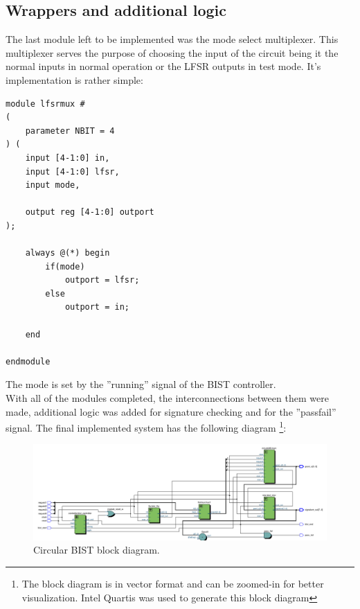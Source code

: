\documentclass[12pt]{article}
\begin{document}
    \subsection*{Wrappers and additional logic}
    
    The last module left to be implemented was the mode select multiplexer. This multiplexer serves the purpose of choosing the input of the circuit being it the normal inputs in normal operation or the LFSR outputs in test mode. It's implementation is rather simple:
    
    \begin{lstlisting}[caption={Multiplexer code.},captionpos=b]
module lfsrmux #
(
    parameter NBIT = 4     
) (
    input [4-1:0] in,
    input [4-1:0] lfsr,
    input mode,

    output reg [4-1:0] outport
);
    
    always @(*) begin
        if(mode)
            outport = lfsr;
        else
            outport = in;
        
    end

endmodule
    \end{lstlisting}     
    The mode is set by the ''running'' signal of the BIST controller.\\
    
    
    With all of the modules completed, the interconnections between them were made, additional logic was added for signature checking and for the ''pass\textunderscore fail'' signal. The final implemented system has the following diagram \footnote{The block diagram is in vector format and can be zoomed-in for better visualization. Intel Quartis was used to generate this block diagram}:
    
    \begin{figure}[!htb]
        \centering
        \includegraphics[scale=0.8]{block_diagram.pdf}
            \caption{Circular BIST block diagram.}
            \label{fig:bd}
    \end{figure}
    
\newpage
    
\end{document}
